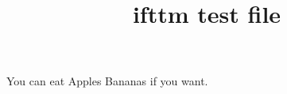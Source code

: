 \documentclass[12pt]{article}
\title{ifttm test file}
\begin{document}
You can eat \ifttm Apples \else Bananas \fi if you want.
\end{document}
